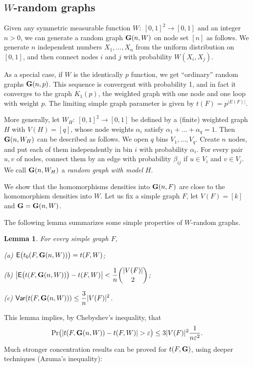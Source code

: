 \documentclass[fleqn]{article}
\newtheorem{lemma}[theorem]{Lemma}
\begin{document}
\subsection{$W$-random graphs}

Given any symmetric measurable function $W:~[0,1]^2\to[0,1]$ and an
integer $n>0$, we can generate a random graph ${\mathbf G}(n,W)$ on node set
$[n]$ as follows. We generate $n$ independent numbers $X_1,\dots,X_n$
from the uniform distribution on $[0,1]$, and then connect nodes $i$
and $j$ with probability $W(X_i,X_j)$.

As a special case, if $W$ is the identically $p$ function, we get
``ordinary'' random graphs ${\mathbf G}(n,p)$. This sequence is convergent
with probability 1, and in fact it converges to the graph $K_{1}(p)$,
the weighted graph with one node and one loop with weight $p$. The
limiting simple graph parameter is given by $t(F)=p^{|E(F)|}$.

More generally, let $W_H:~[0,1]^2\to[0,1]$ be defined by a (finite)
weighted graph $H$ with $V(H)=[q]$, whose node weights $\alpha_i$
satisfy $\alpha_1+\dots+\alpha_q=1$. Then ${\mathbf G}(n,W_H)$ can be
described as follows. We open $q$ bins $V_1,\dots, V_q$. Create $n$
nodes, and put each of them independently in bin $i$ with probability
$\alpha_i$. For every pair $u,v$ of nodes, connect them by an edge
with probability $\beta_{ij}$ if $u\in V_i$ and $v\in V_j$. We call
${\mathbf G}(n,W_H)$ a {\it random graph with model} $H$.

We show that the homomorphisms densities into ${\mathbf G}(n,F)$ are close to
the homomorphism densities into $W$. Let us fix a simple graph $F$,
let $V(F)=[k]$ and ${\mathbf G}={\mathbf G}(n,W)$.

The following lemma summarizes some simple properties of $W$-random
graphs.

\begin{lemma}\label{EXPINJ}
For every simple graph $F$,

\smallskip

{\rm (a)} ${\sf E}\bigl(t_0(F,{\mathbf G}(n,W))\bigr)= t(F,W)$;

\smallskip

{\rm (b)} $\displaystyle \bigl|{\sf E}\bigl(t(F,{\mathbf G}(n,W))\bigr)-
t(F,W)\bigr|<\frac{1}{n}\binom{|V(F)|}{2}$;

\smallskip

{\rm (c)} $\displaystyle {\sf Var}(t(F,{\mathbf G}(n,W)))\le\frac{3}{n}|V(F)|^2$.
\end{lemma}

This lemma implies, by Chebyshev's inequality, that
\[
\Pr\bigl(|t(F,\Ge(n,W))-t(F,W)|>\eps\bigr) \leq
3|V(F)|^2\frac{1}{n\eps^2}.
\]
Much stronger concentration results can be proved for $t(F,{\mathbf G})$,
using deeper techniques (Azuma's inequality):
\end{document}
